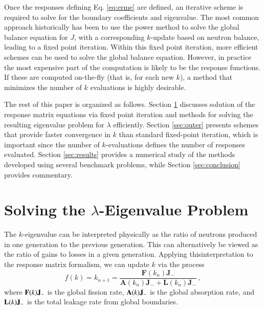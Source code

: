 Once the responses defining Eq. \ref{eq:erme}  are defined, an 
iterative scheme is 
required to solve for the boundary coefficients and eigenvalue.  The most
common approach historically has been to use the power method to solve the 
global balance equation for $J$, with a corresponding $k$-update 
based on neutron balance, leading to a fixed point iteration.  
Within this fixed point iteration, more efficient schemes can be 
used to solve the global balance equation.  
However, in practice the most expensive part of the computation is likely 
to be the response functions.  If these are computed on-the-fly (that is, 
for each new $k$), a method that minimizes the number of $k$ evaluations is
highly desirable.

The rest of this paper is organized as follows.  Section \ref{sec:inner}
discusses solution of the response matrix equations via fixed point 
iteration and methods for solving the resulting eigenvalue problem 
for $\lambda$ efficiently.  Section \ref{sec:outer} presents schemes 
that provide faster convergence in $k$ than standard fixed-point iteration,
which is important since the number of $k$-evaluations defines the 
number of responses evaluated.  Section \ref{sec:results} provides 
a numerical study of the methods developed using 
several benchmark problems, while Section \ref{sec:conclusion}
provides commentary.


\section{Solving the $\lambda$-Eigenvalue Problem}
\label{sec:inner}

The $k$-eigenvalue can be interpreted physically as the ratio of neutrons
produced in one generation to the previous generation.  This can 
alternatively be viewed as the ratio of gains to losses in a given 
generation. Applying thisinterpretation to the response matrix formalism, 
we can update $k$ via the process
\begin{equation}
 f(k) = k_{n+1} = \frac{\mathbf{F}(k_{n})\mathbf{J}_{-}} 
    { \mathbf{A}(k_{n}) \mathbf{J}_{-} + \mathbf{L}(k_{n}) \mathbf{J}_{-} }\, ,
\label{eq:picard}
\end{equation}
where $\mathbf{F}(k)\mathbf{J}_{-}$ is the global fission rate, 
$\mathbf{A}(k) \mathbf{J}_{-}$ is the global absorption rate,
and $\mathbf{L}(k) \mathbf{J}_{-}$ is the total leakage rate
from global boundaries.

